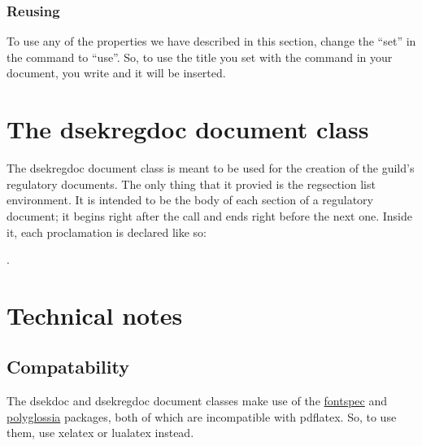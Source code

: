 \documentclass[a4paper, oneside]{ltxdoc}
\begin{document}
\subsubsection{Reusing}
To use any of the properties we have described in this section, change the
``set'' in the command to ``use''.  So, to use the title you set with the
 command in your document, you write  and it will be
inserted.

\section{The \textsf{dsekregdoc} document class}
The \textsf{dsekregdoc} document class is meant to be used for the creation of
the guild's regulatory documents.  The only thing that it provied is the
\textsf{regsection} list environment.  It is intended to be the body of each
section of a regulatory document; it begins right after the  call
and ends right before the next one.  Inside it, each proclamation is declared 
like so:

\begin{center}
  .
\end{center}

\section{Technical notes}

\subsection{Compatability}

The \textsf{dsekdoc} and \textsf{dsekregdoc} document classes make use of the
\href{https://ctan.org/pkg/fontspec}{\textsf{fontspec}} and
\href{https://ctan.org/pkg/polyglossia}{\textsf{polyglossia}} packages, both of which are
incompatible with \textsf{pdflatex}. So, to use them, use \textsf{xelatex} or
\textsf{lualatex} instead.
\end{document}
